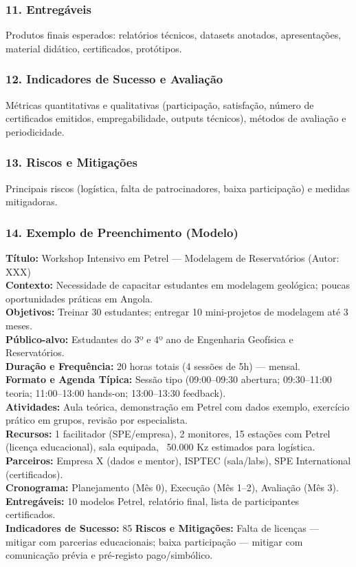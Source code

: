 \documentclass[12pt,a4paper]{article}
\begin{document}
\subsubsection*{11. Entregáveis}
Produtos finais esperados: relatórios técnicos, datasets anotados, apresentações, material didático, certificados, protótipos.

\subsubsection*{12. Indicadores de Sucesso e Avaliação}
Métricas quantitativas e qualitativas (participação, satisfação, número de certificados emitidos, empregabilidade, outputs técnicos), métodos de avaliação e periodicidade.

\subsubsection*{13. Riscos e Mitigações}
Principais riscos (logística, falta de patrocinadores, baixa participação) e medidas mitigadoras.

\subsubsection*{14. Exemplo de Preenchimento (Modelo)}
\textbf{Título:} Workshop Intensivo em Petrel — Modelagem de Reservatórios (Autor: XXX) \\
\textbf{Contexto:} Necessidade de capacitar estudantes em modelagem geológica; poucas oportunidades práticas em Angola. \\
\textbf{Objetivos:} Treinar 30 estudantes; entregar 10 mini-projetos de modelagem até 3 meses. \\
\textbf{Público-alvo:} Estudantes do 3º e 4º ano de Engenharia Geofísica e Reservatórios. \\
\textbf{Duração e Frequência:} 20 horas totais (4 sessões de 5h) — mensal. \\
\textbf{Formato e Agenda Típica:} Sessão tipo (09:00–09:30 abertura; 09:30–11:00 teoria; 11:00–13:00 hands-on; 13:00–13:30 feedback). \\
\textbf{Atividades:} Aula teórica, demonstração em Petrel com dados exemplo, exercício prático em grupos, revisão por especialista. \\
\textbf{Recursos:} 1 facilitador (SPE/empresa), 2 monitores, 15 estações com Petrel (licença educacional), sala equipada, ~50.000 Kz estimados para logística. \\
\textbf{Parceiros:} Empresa X (dados e mentor), ISPTEC (sala/labs), SPE International (certificados). \\
\textbf{Cronograma:} Planejamento (Mês 0), Execução (Mês 1–2), Avaliação (Mês 3). \\
\textbf{Entregáveis:} 10 modelos Petrel, relatório final, lista de participantes certificados. \\
\textbf{Indicadores de Sucesso:} 85%
\textbf{Riscos e Mitigações:} Falta de licenças — mitigar com parcerias educacionais; baixa participação — mitigar com comunicação prévia e pré-registo pago/simbólico.
\end{document}
